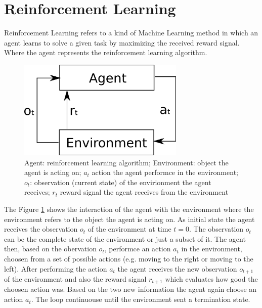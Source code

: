 \section{Reinforcement Learning}

Reinforcement Learning refers to a kind of Machine Learning method in which an agent learns to solve a given task by maximizing the received reward signal. Where the agent represents the reinforcement learning algorithm.\\



\begin{figure}[H]
  \centering
  \includegraphics[width=300px]{Images/rl_agent.png} 
  \caption{Agent: reinforcement learning algorithm; Environment: object the agent is acting on; $a_t$ action the agent performce in the environment; $o_t$: observation (current state) of the envirionment the agent receives; $r_t$ reward signal the agent receives from the environment}
  \label{fig:reinforcement_learning}
\end{figure}



The Figure \ref{fig:reinforcement_learning} shows the interaction of the agent with the environment where the environment refers to the object the agent is acting on. As initial state the agent receives the observation $o_t$ of the environment at time $t = 0$. The observation $o_t$ can be the complete state of the environment or just a subset of it.
The agent then, based on the obervation $o_t$, performce an action $a_t$ in the environment, choosen from a set of possible actions (e.g. moving to the right or moving to the left). After performing the action $a_t$ the agent receives the new observation $o_{t+1}$ of the environment and also the reward signal $r_{t+1}$ which evaluates how good the choosen action was.
Based on the two new information the agent again choose an action $a_t$. The loop continuouse until the environment sent a termination state.\\

